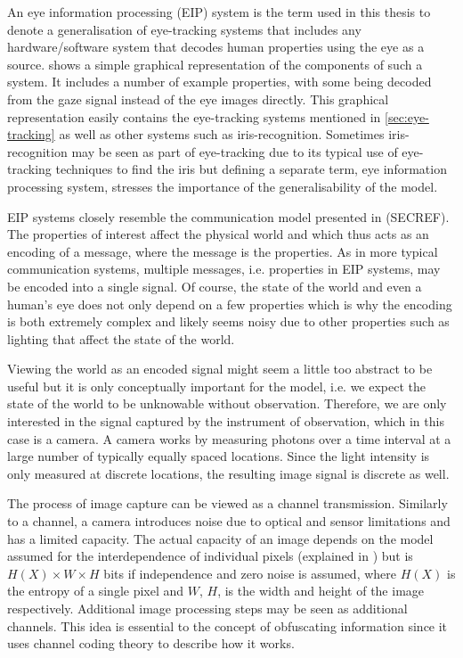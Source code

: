 An eye information processing (EIP) system is the term used in this thesis to denote a generalisation of eye-tracking systems that includes any hardware/software system that decodes human properties using the eye as a source.  shows a simple graphical representation of the components of such a system. It includes a number of example properties, with some being decoded from the gaze signal instead of the eye images directly. This graphical representation easily contains the eye-tracking systems mentioned in \cref{sec:eye-tracking} as well as other systems such as iris-recognition. Sometimes iris-recognition may be seen as part of eye-tracking due to its typical use of eye-tracking techniques to find the iris but defining a separate term, eye information processing system, stresses the importance of the generalisability of the model.

EIP systems closely resemble the communication model presented in (SECREF). The properties of interest affect the physical world and which thus acts as an encoding of a message, where the message is the properties. As in more typical communication systems, multiple messages, i.e. properties in EIP systems, may be encoded into a single signal. Of course, the state of the world and even a human's eye does not only depend on a few properties which is why the encoding is both extremely complex and likely seems noisy due to other properties such as lighting that affect the state of the world. 

Viewing the world as an encoded signal might seem a little too abstract to be useful but it is only conceptually important for the model, i.e. we expect the state of the world to be unknowable without observation. Therefore, we are only interested in the signal captured by the instrument of observation, which in this case is a camera. A camera works by measuring photons over a time interval at a large number of typically equally spaced locations. Since the light intensity is only measured at discrete locations, the resulting image signal is discrete as well. 

The process of image capture can be viewed as a channel transmission. Similarly to a channel, a camera introduces noise due to optical and sensor limitations and has a limited capacity. The actual capacity of an image depends on the model assumed for the interdependence of individual pixels (explained in ) but is $H(X)\times W\times H$ bits if independence and zero noise is assumed, where $H(X)$ is the entropy of a single pixel and $W$, $H$, is the width and height of the image respectively. Additional image processing steps may be seen as additional channels. This idea is essential to the concept of obfuscating information since it uses channel coding theory to describe how it works. 

